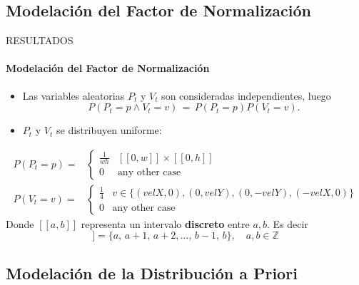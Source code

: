 \subsection{Modelación del Factor de Normalización}

\begin{frame}{RESULTADOS}
    \framesubtitle{Modelación del Factor de Normalización}
    \begin{itemize}
        \item Las variables aleatorias $P_t$ y $V_t$ son consideradas independientes, luego
        \begin{equation}
            P(P_t=p\wedge V_t=v)\,=\,P(P_t=p)P(V_t=v).
        \end{equation}
        \item $P_t$ y $V_t$ se distribuyen uniforme:
    \end{itemize}
    \begin{align}
        P\left( P_{t}=p \right)=&
        \begin{cases}
            \frac{1}{wh} & [[0,w]]\times[[0,h]] \\
        0 & \text{any other case}
        \end{cases}\\
        P\left( V_{t}=v \right)=&
        \begin{cases}
            \frac{1}{4} &  v\in\{(velX,0),(0,velY),(0,-velY),(-velX,0)\}\\
        0 & \text{any other case}
        \end{cases}
    \end{align}
    Donde $[[a,b]]$ representa un intervalo \textbf{discreto} entre $a,b$. Es decir
    \begin{equation*}
        [[a,b]]=\{a,\,a+1,\,a+2,...,\,b-1,\,b\},\quad a,b\in\mathbb{Z}
    \end{equation*}
\end{frame}
\subsection{Modelación de la Distribución a Priori}

